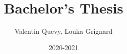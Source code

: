\title{Bachelor's Thesis} 

\def\vubsubtitle{mid-term report} %

\author{Valentin Quevy, Louka Grignard} %

\date{2020-2021} %


\def\vubpromoters{promoter: abdellah touhafi} %


\def\vubfaculty{ENGINEERING SCIENCES}  %


